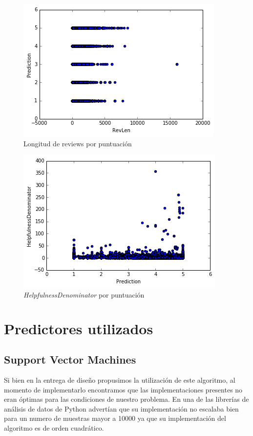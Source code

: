 \documentclass[10pt,a4paper]{article}
\begin{document}
\begin{figure}
\centering
\includegraphics[scale=0.7]{revlen}
\caption{Longitud de reviews por puntuación}
\label{fig:rev_len}
\end{figure}

\begin{figure}
\centering
\includegraphics[scale=0.7]{hdenom}
\caption{\textit{HelpfulnessDenominator} por puntuación}
\label{fig:hdenom}
\end{figure}
\section{Predictores utilizados}

\subsection{Support Vector Machines}
Si bien en la entrega de diseño propusimos la utilización de este algoritmo, al momento de implementarlo encontramos que las implementaciones presentes no eran óptimas para las condiciones de nuestro problema. En una de las librerías de análisis de datos de Python advertían que su implementación no escalaba bien para un numero de muestras mayor a 10000 ya que su implementación del algoritmo es de orden cuadrático. \cite{sklearn_svc}
\end{document}
